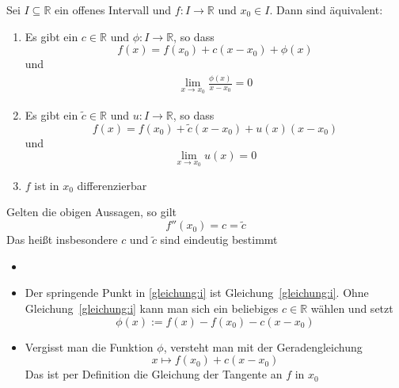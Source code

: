 \begin{Satz}{
	Sei $I \subseteq \mathbb{R}$ ein offenes Intervall und $f: I \rightarrow \mathbb{R}$ und $x_0 \in I$. Dann sind äquivalent:
	\begin{enumerate}
		\item \label{satz1:i}Es gibt ein $c \in \mathbb{R}$ und $\phi: I \rightarrow \mathbb{R}$, so dass
		\begin{equation*}
		f\left(x\right) = f\left(x_0\right) + c\left(x-x_0\right) + \phi\left(x\right)
		\end{equation*} 
		und 
		\begin{align} 
			\lim\limits_{x \rightarrow x_0}{\frac{\phi\left(x\right)}{x-x_0}}  = 0
			\label{gleichung:i}
		\end{align}
		\item Es gibt ein $ \tilde{c} \in \mathbb{R}$ und $
		u: I \rightarrow \mathbb{R}$, so dass 
	\begin{equation*}		
		f\left(x\right) = f\left(x_0\right) + \tilde{c}\left(x-x_0\right) + u\left(x
		\right)\left(x-x_0\right)
		\end{equation*}
		und 
		\begin{equation*}
		\lim\limits_{x \rightarrow x_0}{u\left(x\right) = 0}
		\end{equation*}
		\item $f$ ist in $x_0$ differenzierbar
	\end{enumerate}
	Gelten die obigen Aussagen, so gilt 
	\begin{equation*}
		f''\left(x_0\right) = c = \tilde{c}
	\end{equation*}
	Das heißt insbesondere $c$ und $\tilde{c}$ sind eindeutig bestimmt

}\end{Satz}

\begin{Bemerkung}{
	\begin{itemize}
		\item[ ]
		\item Der springende Punkt in \ref{gleichung:i} ist 
		Gleichung~\ref{gleichung:i}. Ohne Gleichung~\ref{gleichung:i} 
		kann man sich ein beliebiges $c \in \mathbb{R}$ wählen und setzt 
	\begin{equation*}
	\phi\left(x\right) := f\left(x\right) - f\left(x_0\right) - c\left(x-x_0\right)
	\end{equation*}			
	\item Vergisst man die Funktion $\phi$, versteht man mit der Geradengleichung
		\begin{equation*}
		x \mapsto f\left(x_0\right) + c\left(x-x_0\right)
		\end{equation*}
		Das ist per Definition die Gleichung der Tangente an $f$ in $x_0$
	\end{itemize}
}\end{Bemerkung}

